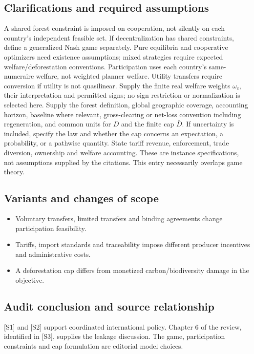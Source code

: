 \documentclass[11pt,a4paper]{article}
\begin{document}
\subsection*{Clarifications and required assumptions}

A shared forest constraint is imposed on cooperation, not silently on each country's independent feasible set. If decentralization has shared constraints, define a generalized Nash game separately. Pure equilibria and cooperative optimizers need existence assumptions; mixed strategies require expected welfare/deforestation conventions. Participation uses each country's same-numeraire welfare, not weighted planner welfare. Utility transfers require conversion if utility is not quasilinear. Supply the finite real welfare weights \(\omega_c\), their interpretation and permitted signs; no sign restriction or normalization is selected here. Supply the forest definition, global geographic coverage, accounting horizon, baseline where relevant, gross-clearing or net-loss convention including regeneration, and common units for \(D\) and the finite cap \(\bar D\). If uncertainty is included, specify the law and whether the cap concerns an expectation, a probability, or a pathwise quantity. State tariff revenue, enforcement, trade diversion, ownership and welfare accounting. These are instance specifications, not assumptions supplied by the citations. This entry necessarily overlaps game theory.

\subsection*{Variants and changes of scope}

\begin{itemize}
\item Voluntary transfers, limited transfers and binding agreements change participation feasibility.
\item Tariffs, import standards and traceability impose different producer incentives and administrative costs.
\item A deforestation cap differs from monetized carbon/biodiversity damage in the objective.
\end{itemize}

\subsection*{Audit conclusion and source relationship}

[S1] and [S2] support coordinated international policy. Chapter 6 of the review, identified in [S3], supplies the leakage discussion. The game, participation constraints and cap formulation are editorial model choices.
\end{document}

